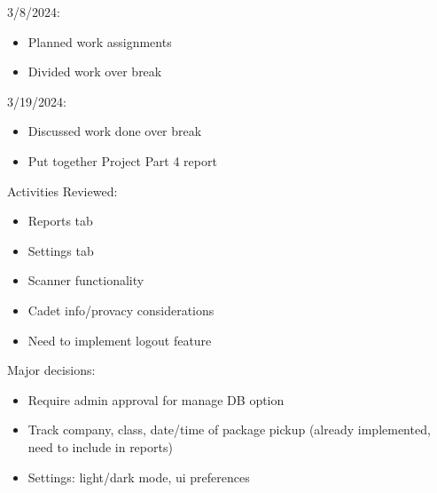 \documentclass[11pt]{article}
\begin{document}
3/8/2024:
\begin{itemize}
\item Planned work assignments
\item Divided work over break
\end{itemize}

3/19/2024:
\begin{itemize}
\item Discussed work done over break
\item Put together Project Part 4 report
\end{itemize}


Activities Reviewed:
\begin{itemize}
\item Reports tab
\item Settings tab
\item Scanner functionality
\item Cadet info/provacy considerations
\item Need to implement logout feature
\end{itemize}

Major decisions:
\begin{itemize}
\item Require admin approval for manage DB option
\item Track company, class, date/time of package pickup (already implemented, need to include in reports)
\item Settings: light/dark mode, ui preferences
\end{itemize}
\end{document}
